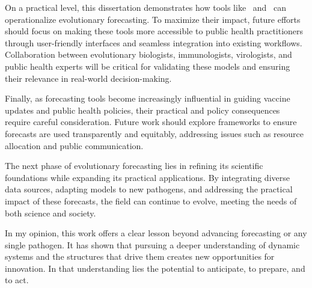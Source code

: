 On a practical level, this dissertation demonstrates how tools like \evofr\ and \forecastsNcov\ can operationalize evolutionary forecasting.
To maximize their impact, future efforts should focus on making these tools more accessible to public health practitioners through user-friendly interfaces and seamless integration into existing workflows.
Collaboration between evolutionary biologists, immunologists, virologists, and public health experts will be critical for validating these models and ensuring their relevance in real-world decision-making.

Finally, as forecasting tools become increasingly influential in guiding vaccine updates and public health policies, their practical and policy consequences require careful consideration.
Future work should explore frameworks to ensure forecasts are used transparently and equitably, addressing issues such as resource allocation and public communication.

The next phase of evolutionary forecasting lies in refining its scientific foundations while expanding its practical applications.
By integrating diverse data sources, adapting models to new pathogens, and addressing the practical impact of these forecasts, the field can continue to evolve, meeting the needs of both science and society.


In my opinion, this work offers a clear lesson beyond advancing forecasting or any single pathogen.
It has shown that pursuing a deeper understanding of dynamic systems and the structures that drive them creates new opportunities for innovation.
In that understanding lies the potential to anticipate, to prepare, and to act.
